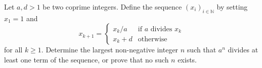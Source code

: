 Let $a,d > 1$ be two coprime integers. Define the sequence $(x_i)_{i \in \mathbb{N}}$ by setting $x_1 = 1$ and
$$x_{k+1} = \begin{cases}
x_k/a & \text{if } a \text{ divides } x_k\\
x_k + d & \text{otherwise}
\end{cases}$$
for all $k\geq 1$.
Determine the largest non-negative integer $n$ such that $a^n$ divides at least one term of the sequence,
or prove that no such $n$ exists.
